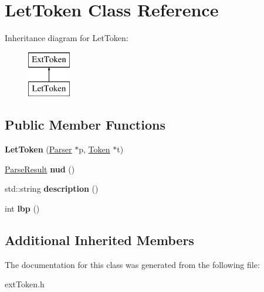 \hypertarget{class_let_token}{}\section{Let\+Token Class Reference}
\label{class_let_token}
Inheritance diagram for Let\+Token\+:\begin{figure}[H]
\begin{center}
\leavevmode
\includegraphics[height=2.000000cm]{class_let_token}
\end{center}
\end{figure}
\subsection*{Public Member Functions}
\begin{DoxyCompactItemize}
\item 
\hypertarget{class_let_token_a94651a82207e47cd2c1066a58cb1fe08}{}{\bfseries Let\+Token} (\hyperlink{class_parser}{Parser} $\ast$p, \hyperlink{class_token}{Token} $\ast$t)\label{class_let_token_a94651a82207e47cd2c1066a58cb1fe08}

\item 
\hypertarget{class_let_token_a14df948cdf775bde8392bf58d53b91f3}{}\hyperlink{class_parse_result}{Parse\+Result} {\bfseries nud} ()\label{class_let_token_a14df948cdf775bde8392bf58d53b91f3}

\item 
\hypertarget{class_let_token_a2c5ba0489774bf6468a26f4e19d7fab4}{}std\+::string {\bfseries description} ()\label{class_let_token_a2c5ba0489774bf6468a26f4e19d7fab4}

\item 
\hypertarget{class_let_token_a2a5ab5bc5897340513480c162bb2b065}{}int {\bfseries lbp} ()\label{class_let_token_a2a5ab5bc5897340513480c162bb2b065}

\end{DoxyCompactItemize}
\subsection*{Additional Inherited Members}


The documentation for this class was generated from the following file\+:\begin{DoxyCompactItemize}
\item 
ext\+Token.\+h\end{DoxyCompactItemize}
